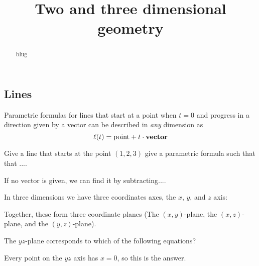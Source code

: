 \documentclass{ximera}
\title[Dig-In:]{Two and three dimensional geometry}
\begin{document}
\begin{abstract}
  blug
\end{abstract}
\maketitle

\subsection{Lines}

Parametric formulas for lines that start at a point when $t=0$ and
progress in a direction given by a vector can be described in
\textit{any} dimension as
\[
\ell(t) = \mathrm{point} + t\cdot \mathbf{vector}
\]
\begin{question}
  Give a line that starts at the point $(1,2,3)$ give a parametric
  formula such that that ....
\end{question}

If no vector is given, we can find it by subtracting.... 


In three dimensions we have three coordinates axes, the $x$, $y$, and
$z$ axis:

\begin{image}
\end{image}

Together, these form three coordinate planes (The $(x,y)$-plane, the
$(x,z)$-plane, and the $(y,z)$-plane).

\begin{question}
	The $yz$-plane corresponds to which of the following equations?
	
	\begin{multipleChoice}
	\end{multipleChoice}
	
	\begin{hint}
	  Every point on the $yz$ axis has $x=0$, so this is the answer.
	\end{hint}
\end{question}
\end{document}
